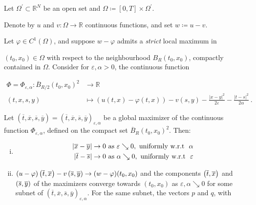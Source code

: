 \begin{lemma}
		 	\label{doubling device}
		 	Let $ \Omega^{\prime} \subset \mathbb{R}^N $ be an open set and $ \Omega \coloneqq \left[0, T\right] \times \Omega^{\prime} $. 
		 	
		 	Denote by $ u $ and $ v : \Omega \to \mathbb{R} $ continuous functions, and set $ w \coloneqq u - v $.
		 	 
		 	Let $ \varphi \in C^{1}(\Omega) $, and suppose $ w - \varphi $ admits a \emph{strict} local maximum in 
		 	
		 	$ (t_0, x_0) \in \Omega $ with respect to the neighbourhood $ B_R(t_0, x_0) $, compactly contained in $\Omega $. Consider for $ \varepsilon, \alpha > 0 $, the continuous function
		 	
		 	\begin{align*}
		 	\Phi = \Phi_{\varepsilon, \alpha} :\overline{B} _{R / 2}(t_0, x_0)^2 &\to \mathbb{R} \\
		 	(t, x, s, y) &\mapsto (u(t, x) - \varphi(t, x)) - v(s, y) - \frac{\lvert x - y \rvert^2 }{2 \varepsilon} - \frac{\lvert t - s \rvert^2}{2 \alpha} \ .
		 	\end{align*}
		 	
		 	Let $ (\overline{t}, \overline{x}, \overline{s}, \overline{y}) = (\overline{t}, \overline{x}, \overline{s}, \overline{y})_{\varepsilon, \alpha} $ be a global maximizer of the continuous function $ \Phi_{\varepsilon, \alpha} $, defined on the compact set $ \overline{B}_R(t_0, x_0)^2 $. Then:
		 	
		 	\begin{enumerate}[(i)]
		 		\item 
		 		\label{distance convergence}
		 		\begin{align*}
		 		\lvert \overline{x} - \overline{y} \rvert &\to 0 \hbox{ as } \varepsilon \searrow 0, \hbox{ uniformly w.r.t } \  \alpha \\
		 		\lvert \overline{t} - \overline{s} \rvert &\to 0 \hbox{ as } \alpha \searrow 0, \hbox{ uniformly w.r.t } \ \varepsilon 
		 		\end{align*}
		 		
		 		\item
		 		\label{maximizer convergence} 
		 		$ (u - \varphi)\left(\overline{t}, \overline{x}\right) - v\left(\overline{s}, \overline{y}\right) \to (w - \varphi)(t_0, x_0) $ and the components $ \left(\overline{t}, \overline{x}\right) $ and $ \left(\overline{s}, \overline{y}\right) $ of the maximizers converge towards $ (t_0, x_0) $ as $ \varepsilon, \alpha \searrow 0 $ for some subnet of $ (\overline{t}, \overline{x}, \overline{s}, \overline{y})_{\varepsilon, \alpha} $. 
		 		For the same subnet, the vectors $ p $ and $ q $, with
		 		

\end{enumerate}
\end{lemma}
